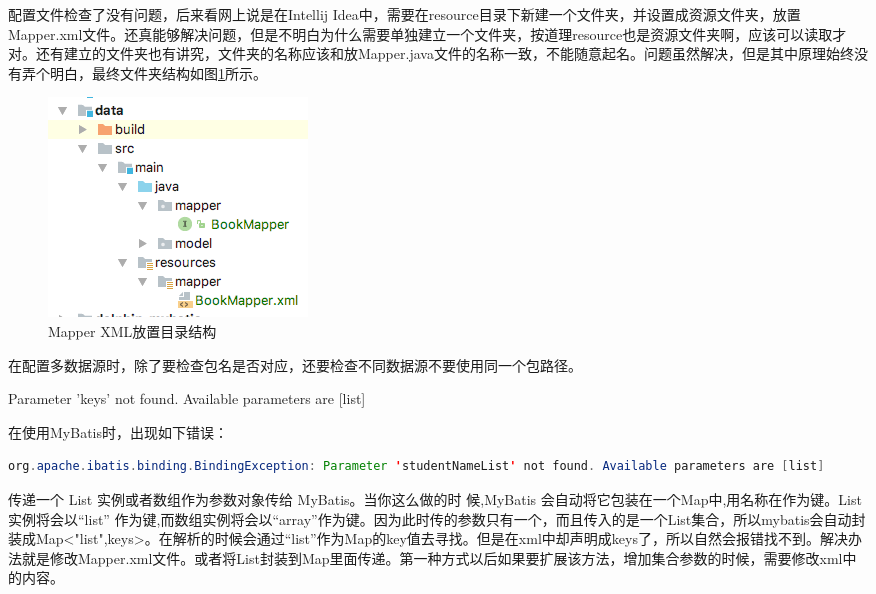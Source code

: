 \documentclass[12pt]{book}
\makeatletter
\numberwithin{dummy}{section}
\theoremstyle{ocrenumbox}
\theoremstyle{blacknumex}
\theoremstyle{blacknumbox}
\theoremstyle{ocrenum}
\renewcommand\paragraph{\@startsection{paragraph}{4}{\z@}
	{-2ex \@plus-.2ex \@minus .2ex}
	{.1ex}
	{\normalfont\small\sffamily\bfseries}}
\makeatother
\begin{document}
配置文件检查了没有问题，后来看网上说是在Intellij Idea中，需要在resource目录下新建一个文件夹，并设置成资源文件夹，放置Mapper.xml文件。还真能够解决问题，但是不明白为什么需要单独建立一个文件夹，按道理resource也是资源文件夹啊，应该可以读取才对。还有建立的文件夹也有讲究，文件夹的名称应该和放Mapper.java文件的名称一致，不能随意起名。问题虽然解决，但是其中原理始终没有弄个明白，最终文件夹结构如图\ref{fig:mapperreourcestructure}所示。

\begin{figure}[htbp]
	\centering
	\includegraphics[scale=0.7]{mapperreourcestructure.png}
	\caption{Mapper XML放置目录结构}
	\label{fig:mapperreourcestructure}
\end{figure}

在配置多数据源时，除了要检查包名是否对应，还要检查不同数据源不要使用同一个包路径。

\paragraph{Parameter 'keys' not found. Available parameters are [list]}

在使用MyBatis时，出现如下错误：

\begin{lstlisting}[language=Java]
org.apache.ibatis.binding.BindingException: Parameter 'studentNameList' not found. Available parameters are [list]
\end{lstlisting}

传递一个 List 实例或者数组作为参数对象传给 MyBatis。当你这么做的时 候,MyBatis 会自动将它包装在一个Map中,用名称在作为键。List 实例将会以“list” 作为键,而数组实例将会以“array”作为键。因为此时传的参数只有一个，而且传入的是一个List集合，所以mybatis会自动封装成Map<"list",keys>。在解析的时候会通过“list”作为Map的key值去寻找。但是在xml中却声明成keys了，所以自然会报错找不到。解决办法就是修改Mapper.xml文件。或者将List封装到Map里面传递。第一种方式以后如果要扩展该方法，增加集合参数的时候，需要修改xml中的内容。
\end{document}
